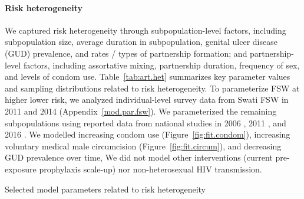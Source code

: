 \paragraph{Risk heterogeneity}
We captured risk heterogeneity through subpopulation-level factors, including
subpopulation size, average duration in subpopulation,
genital ulcer disease (GUD) prevalence, and rates / types of partnership formation;
and partnership-level factors, including
assortative mixing, partnership duration, frequency of sex, and levels of condom use.
Table~\ref{tab:art.het} summarizes key parameter values and sampling distributions related to risk heterogeneity.
To parameterize FSW at higher \vs lower risk, we analyzed individual-level survey data
from Swati FSW in 2011 \cite{Baral2014} and 2014 \cite{EswKP2014} (Appendix~\ref{mod.par.fsw}).
We parameterized the remaining subpopulations using reported data from national studies in
2006 \cite{SDHS2006}, 2011 \cite{SHIMS1}, and 2016 \cite{SHIMS2}.
We modelled
increasing condom use (Figure~\ref{fig:fit.condom}),
increasing voluntary medical male circumcision (Figure~\ref{fig:fit.circum}), and
decreasing GUD prevalence over time,
We did not model other interventions
(\eg current pre-exposure prophylaxis scale-up)
nor non-heterosexual HIV transmission.
\begin{table}
  \centering
  \caption{Selected model parameters related to risk heterogeneity}
  
  \label{tab:art.het}
\end{table}
